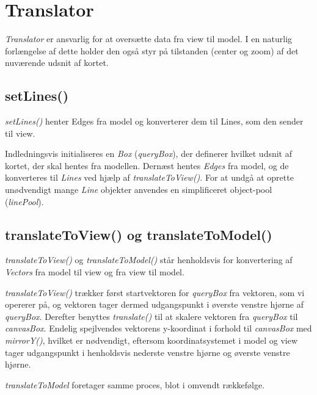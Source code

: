 \section{Translator}

\emph{Translator} er ansvarlig for at oversætte data fra view til model. I en naturlig forlængelse af dette holder den også styr på tilstanden (center og zoom) af det nuværende udsnit af kortet.

\subsection{setLines()}

\emph{setLines()} henter Edges fra model og konverterer dem til Lines, som den sender til view.

Indledningsvis initialiseres en \emph{Box} (\emph{queryBox}), der definerer hvilket udsnit af kortet, der skal hentes fra modellen. Dernæst hentes \emph{Edges} fra model, og de konverteres til \emph{Lines} ved hjælp af \emph{translateToView()}. For at undgå at oprette unødvendigt mange \emph{Line} objekter anvendes en simplificeret object-pool (\emph{linePool}).

\subsection{translateToView() og translateToModel()}

\emph{translateToView()} og \emph{translateToModel()} står henholdsvis for konvertering af \emph{Vectors} fra model til view og fra view til model.

\emph{translateToView()} trækker først startvektoren for \emph{queryBox} fra vektoren, som vi opererer på, og vektoren tager dermed udgangspunkt i øverste venstre hjørne af \emph{queryBox}. Derefter benyttes \emph{translate()} til at skalere vektoren fra \emph{queryBox} til \emph{canvasBox}. Endelig spejlvendes vektorens y-koordinat i forhold til \emph{canvasBox} med \emph{mirrorY()}, hvilket er nødvendigt, eftersom koordinatsystemet i model og view tager udgangspunkt i henholdsvis nederste venstre hjørne og øverste venstre hjørne.

\emph{translateToModel} foretager samme proces, blot i omvendt rækkefølge.